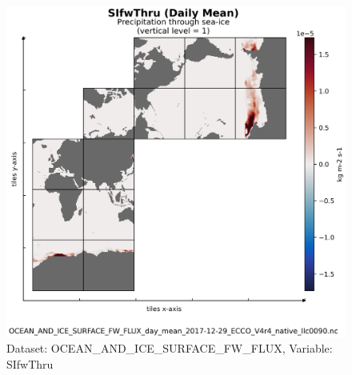 \begin{figure}[H]
\centering
\includegraphics[scale=0.55]{../images/plots/v4r4/native_plots/Ocean_and_Sea-Ice_Surface_Freshwater_Fluxes/SIfwThru.png}
\caption{Dataset: OCEAN\_AND\_ICE\_SURFACE\_FW\_FLUX, Variable: SIfwThru}
\label{tab:table-OCEAN_AND_ICE_SURFACE_FW_FLUX_SIfwThru-Plot}
\end{figure}
\newpage
\pagebreak
